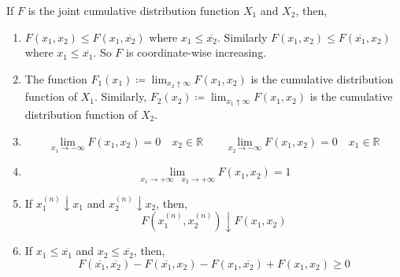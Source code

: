 \begin{theorem}
If $F$ is the joint cumulative distribution function $X_1$ and $X_2$, then,
\begin{enumerate}[noitemsep, topsep=0em]
\item 
    $F(x_1, x_2) \leq F(x_1, \overline{x_2})$ where $x_1 \leq
\overline{x_2}$. Similarly $F(x_1, x_2) \leq F(\overline{x_1}, x_2)$ where
$x_1 \leq \overline{x_1}$. So $F$ is coordinate-wise increasing.
\item
    The function $F_1(x_1) \coloneqq \lim_{x_2 \uparrow \infty} F(x_1, x_2)$ is
the cumulative distribution function of $X_1$. Similarly, $F_2(x_2) \coloneqq
\lim_{x_1 \uparrow \infty} F(x_1, x_2)$ is the cumulative distribution function
of $X_2$.
\item
\[
    \lim_{x_1 \rightarrow -\infty} F(x_1, x_2) = 0 \quad x_2 \in \mathbb{R}
    \qquad
    \lim_{x_2 \rightarrow -\infty} F(x_1, x_2) = 0 \quad x_1 \in \mathbb{R}
\]
\item
\[
    \lim_{x_1 \rightarrow +\infty \quad x_2 \rightarrow +\infty} 
        F(x_1, x_2) = 1
\]
\item
    If $x_1^{(n)} \downarrow x_1$ and $x_2^{(n)} \downarrow x_2$, then,
\[
    F(x_1^{(n)}, x_2^{(n)}) \downarrow F(x_1, x_2)
\]
\item
    If $x_1 \leq \overline{x_1}$ and $x_2 \leq \overline{x_2}$, then,
\[
    F(\overline{x_1}, \overline{x_2}) - F(\overline{x_1}, x_2) - 
    F(x_1, \overline{x_2}) + F(x_1, x_2) \geq 0
\]
\end{enumerate}
\end{theorem}
